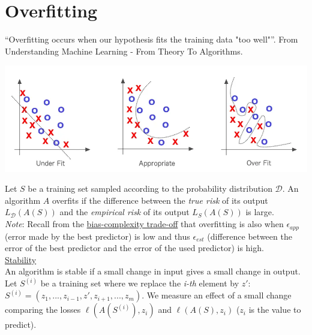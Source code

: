 \section*{Overfitting}

\label{sec:overfitting}

\vspace{5mm}

\newcommand{\quotes}[1]{``#1''}

\quotes{Overfitting occurs when our hypothesis fits the training data "too well"}. From Understanding Machine Learning - From Theory To Algorithms. \\

\begin{center}
\includegraphics[scale=0.4]{overfitting.png}
\end{center}

Let $S$ be a training set sampled according to the probability distribution $\mathcal{D}$.
An algorithm $A$ overfits if the difference between the \textit{true risk} of its output $L_{\mathcal{D}}(A(S))$ and the \textit{empirical risk} of its output $L_S(A(S))$ is large. \\

\textit{Note}: Recall from the \hyperref[sec:bias-complexity-trade-off]{bias-complexity trade-off} that overfitting is also when $\epsilon_{app}$ (error made by the best predictor) is low and thus $\epsilon_{est}$ (difference between the error of the best predictor and the error of the used predictor) is high. \\

\underline{Stability} \\

An algorithm is stable if a small change in input gives a small change in output. \\

Let $S^{(i)}$ be a training set where we replace the \textit{i-th} element by $z'$: $S^{(i)}=(z_1,...,z_{i-1}, z', z_{i+1}, ... , z_m)$. We measure an effect of a small change comparing the losses $\ell(A(S^{(i)}),z_i)$ and $\ell(A(S),z_i)$ ($z_i$ is the value to predict). 

